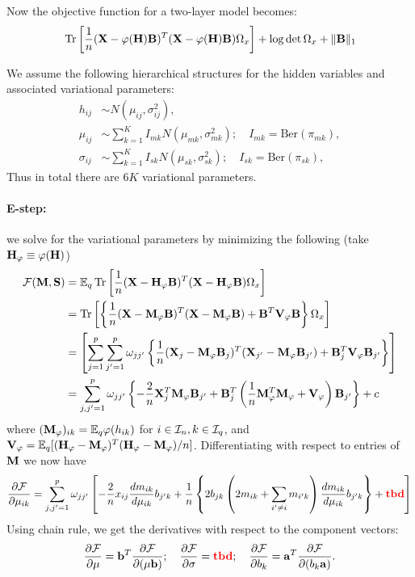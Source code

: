 \documentclass[11pt,letterpaper]{article}
\DeclareMathOperator*{\Tr}{Tr}
\numberwithin{equation}{section}
\begin{document}
Now the objective function for a two-layer model becomes:
%
\begin{align*}
&\Tr \left[ \frac{1}{n} (\bfX - \varphi(\bfH) \bfB )^T (\bfX - \varphi(\bfH) \bfB ) \Omega_x \right] + 
\log \det \Omega_x + \| \bfB\|_1\\
\end{align*}
%

We assume the following hierarchical structures for the hidden variables and associated variational parameters:
%
\begin{align*}
h_{ij} & \sim N(\mu_{ij}, \sigma_{ij}^2),\\
\mu_{ij} & \sim \sum_{k=1}^K I_{mk} N(\mu_{mk}, \sigma_{mk}^2); \quad I_{mk} = \text{Ber}(\pi_{mk}),\\
\sigma_{ij} & \sim \sum_{k=1}^K I_{sk} N(\mu_{sk}, \sigma_{sk}^2); \quad I_{sk} = \text{Ber}(\pi_{sk}),
\end{align*}
%
Thus in total there are $6K$ variational parameters.

\paragraph{E-step:} we solve for the variational parameters by minimizing the following (take ${\mathbf{H}}_\varphi \equiv \varphi({\mathbf{H}})$)
%
\begin{align*}
\cF(\bfM, \bfS) &= \BE_q \Tr \left[ \frac{1}{n} (\bfX - \bfH_\varphi \bfB )^T (\bfX - \bfH_\varphi \bfB ) \Omega_x \right]\\
&= \Tr \left[ \left\{ \frac{1}{n} (\bfX - \bfM_\varphi \bfB )^T(\bfX - \bfM_\varphi \bfB ) +
\bfB^T \bfV_\varphi \bfB \right\} \Omega_x \right]\\
&= \left[ \sum_{j=1}^p \sum_{j'=1}^p \omega_{jj'} \left\{
\frac{1}{n} (\bfX_j - \bfM_\varphi \bfB_j)^T (\bfX_{j'} - \bfM_\varphi \bfB_{j'}) + \bfB_j^T \bfV_\varphi \bfB_{j'}
\right\}\right]\\
&= \sum_{j,j'=1}^p \omega_{jj'} \left\{
-\frac{2}{n} \bfX_j^T \bfM_\varphi \bfB_{j'} + \bfB_j^T \left( \frac{1}{n} \bfM_\varphi^T \bfM_\varphi + \bfV_\varphi \right) \bfB_{j'}\right\} + c
\end{align*}
%
where $({\mathbf{M}}_\varphi)_{ik} = {\mathbb{E}}_q \varphi (h_{ik})$ for $i \in {\cal{I}}_n, k \in {\cal{I}}_q$, and ${\mathbf{V}}_\varphi = {\mathbb{E}}_q [({\mathbf{H}}_\varphi - {\mathbf{M}}_\varphi)^T ({\mathbf{H}}_\varphi - {\mathbf{M}}_\varphi)/n]$. Differentiating with respect to entries of ${\mathbf{M}}$ we now have
%
\begin{align*}
\frac{\partial {\cal{F}}}{\partial \mu_{ik}} = \sum_{j,j'=1}^p \omega_{jj'} \left[
-\frac{2}{n} x_{ij} \frac{d m_{ik}}{d \mu_{ik}} b_{j'k} +
\frac{1}{n} \left\{ 2 b_{jk} \left( 2 m_{ik} + \sum_{i' \neq i} m_{i'k} \right) \frac{dm_{ik}}{d\mu_{ik}} b_{j'k} \right\} +
{\color{red} \bf tbd}
\right]
\end{align*}
%
Using chain rule, we get the derivatives with respect to the component vectors:
%
$$
\frac{\partial {\cal{F}}}{\partial \mu} = {\bf{b}}^T \frac{\partial {\cal{F}}}{\partial (\mu {\bf{b}})}; \quad
\frac{\partial {\cal{F}}}{\partial \sigma} = {\color{red} \bf tbd}; \quad
\frac{\partial {\cal{F}}}{\partial b_k} = {\bf{a}}^T \frac{\partial {\cal{F}}}{\partial (b_k {\bf{a}})}.
$$
\end{document}
